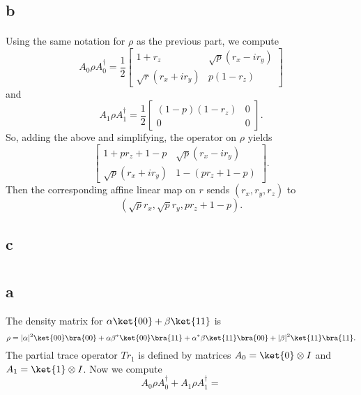 \documentclass[letterpaper,12pt,oneside,onecolumn]{article}
\begin{document}
\subsection{b}
\paragraph{}
Using the same notation for $\rho$ as the previous part, we compute 
$$A_0\rho A_0^\dagger = \frac{1}{2}\begin{bmatrix}
1+r_z & \sqrt{p}(r_x - i r_y) \\ \sqrt{r}(r_x + ir_y) & p(1-r_z)
\end{bmatrix}$$
and $$A_1 \rho A_1^\dagger = \frac{1}{2}\begin{bmatrix} (1-p)(1-r_z) & 0 \\ 0 & 0 \end{bmatrix}.$$
So, adding the above and simplifying, the operator on $\rho$ yields
$$\begin{bmatrix}
1+ pr_z + 1-p & \sqrt{p}(r_x - i r_y) \\ \sqrt{p}(r_x + i r_y) & 1 - (pr_z + 1-p)
\end{bmatrix}.$$
Then the corresponding affine linear map on $r$ sends $(r_x, r_y, r_z)$ to
$$ (\sqrt{p}r_x, \sqrt{p}r_y, pr_z + 1-p).$$
\subsection{c}

\section{}
\subsection{a}
The density matrix for $\alpha\ket{00} + \beta\ket{11}$ is
$$\rho = |\alpha|^2\ket{00}\bra{00} + \alpha\beta^*\ket{00}\bra{11} + \alpha^*\beta\ket{11}\bra{00} + |\beta|^2\ket{11}\bra{11}.$$
The partial trace operator $Tr_1$ is defined by matrices $A_0 = \ket{0} \otimes I$ and $A_1 = \ket{1} \otimes I$. Now we compute
$$A_0\rho A_0^\dagger + A_1\rho A_1^\dagger = $$
\end{document}
